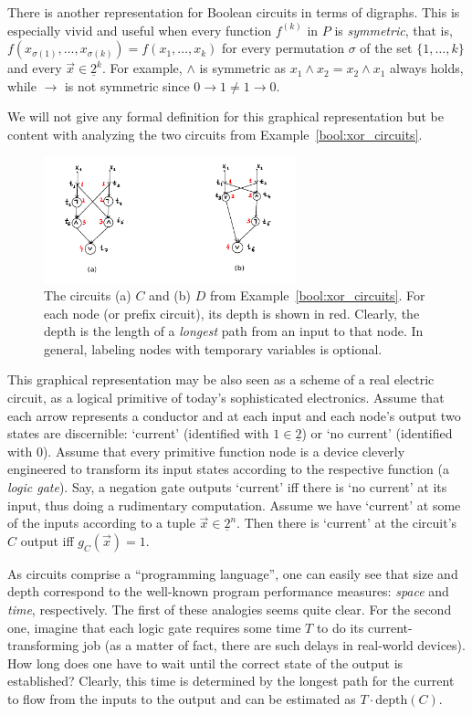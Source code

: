 \documentclass[12pt,notitlepage]{article}
\theoremstyle{plain}
\theoremstyle{definition}
\theoremstyle{plain}
\newcommand{\ul}[1]{\underline{#1}}
\newcommand{\1}{\mathbf{1}}
\newcommand{\0}{\mathbf{0}}
\begin{document}
There is another representation for Boolean circuits in terms of digraphs. This is especially vivid and useful when every function $f^{(k)}$ in $P$ is \emph{symmetric}, that is, $f(x_{\sigma(1)}, \ldots, x_{\sigma(k)}) = f(x_1, \ldots, x_k)$ for every permutation $\sigma$ of the set $\{1,\ldots, k\}$ and every $\vec x \in \ul{2}^k$. For example, $\wedge$ is symmetric as $x_1 \wedge x_2 = x_2 \wedge x_1$ always holds, while $\to$ is not symmetric since $0 \to 1 \neq 1 \to 0$.

We will not give any formal definition for this graphical representation but be content with analyzing the two circuits from Example~\ref{bool:xor_circuits}.

\begin{figure}[h]
\centering
\includegraphics*[width=0.65\textwidth]{circuits_exm.pdf}
\caption{The circuits (a) $C$ and (b) $D$ from Example~\ref{bool:xor_circuits}. For each node (or prefix circuit), its depth is shown in red. Clearly, the depth is the length of a \emph{longest} path from an input to that node. In general, labeling nodes with temporary variables is optional.}
\end{figure}

This graphical representation may be also seen as a scheme of a real electric circuit, as a logical primitive of today's sophisticated electronics. Assume that each arrow represents a conductor and at each input and each node's output two states are discernible: `current' (identified with $1 \in \ul{2}$) or `no current' (identified with $0$). Assume that every primitive function node is a device cleverly engineered to transform its input states according to the respective function (a \emph{logic gate}). Say, a negation gate outputs `current' iff there is `no current' at its input, thus doing a rudimentary computation. Assume we have `current' at some of the inputs according to a tuple $\vec x \in \ul{2}^n$. Then there is `current' at the circuit's $C$ output iff $g_C(\vec x) = 1$.

As circuits comprise a ``programming language'', one can easily see that size and depth correspond to the well-known program performance measures: \emph{space} and \emph{time}, respectively. The first of these analogies seems quite clear. For the second one, imagine that each logic gate requires some time $T$ to do its current-transforming job (as a matter of fact, there are such delays in real-world devices). How long does one have to wait until the correct state of the output is established? Clearly, this time is determined by the longest path for the current to flow from the inputs to the output and can be estimated as $T \cdot \mathrm{depth}(C)$.
\end{document}
